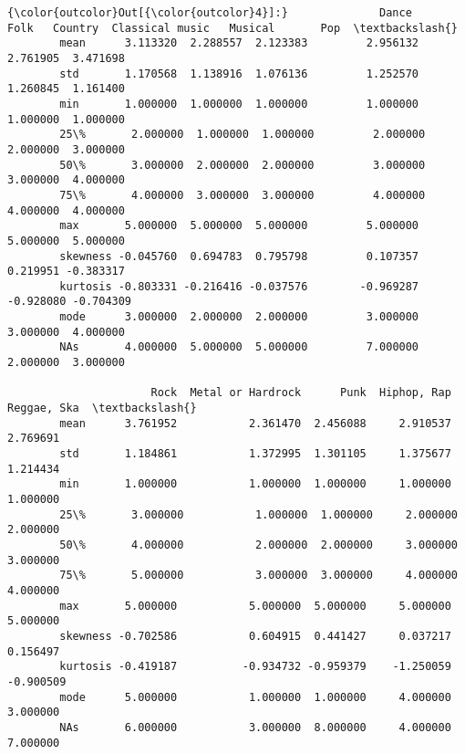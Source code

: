 \documentclass[11pt]{article}
\begin{document}
\begin{Verbatim}[commandchars=\\\{\}]
{\color{outcolor}Out[{\color{outcolor}4}]:}              Dance      Folk   Country  Classical music   Musical       Pop  \textbackslash{}
        mean      3.113320  2.288557  2.123383         2.956132  2.761905  3.471698   
        std       1.170568  1.138916  1.076136         1.252570  1.260845  1.161400   
        min       1.000000  1.000000  1.000000         1.000000  1.000000  1.000000   
        25\%       2.000000  1.000000  1.000000         2.000000  2.000000  3.000000   
        50\%       3.000000  2.000000  2.000000         3.000000  3.000000  4.000000   
        75\%       4.000000  3.000000  3.000000         4.000000  4.000000  4.000000   
        max       5.000000  5.000000  5.000000         5.000000  5.000000  5.000000   
        skewness -0.045760  0.694783  0.795798         0.107357  0.219951 -0.383317   
        kurtosis -0.803331 -0.216416 -0.037576        -0.969287 -0.928080 -0.704309   
        mode      3.000000  2.000000  2.000000         3.000000  3.000000  4.000000   
        NAs       4.000000  5.000000  5.000000         7.000000  2.000000  3.000000   
        
                      Rock  Metal or Hardrock      Punk  Hiphop, Rap  Reggae, Ska  \textbackslash{}
        mean      3.761952           2.361470  2.456088     2.910537     2.769691   
        std       1.184861           1.372995  1.301105     1.375677     1.214434   
        min       1.000000           1.000000  1.000000     1.000000     1.000000   
        25\%       3.000000           1.000000  1.000000     2.000000     2.000000   
        50\%       4.000000           2.000000  2.000000     3.000000     3.000000   
        75\%       5.000000           3.000000  3.000000     4.000000     4.000000   
        max       5.000000           5.000000  5.000000     5.000000     5.000000   
        skewness -0.702586           0.604915  0.441427     0.037217     0.156497   
        kurtosis -0.419187          -0.934732 -0.959379    -1.250059    -0.900509   
        mode      5.000000           1.000000  1.000000     4.000000     3.000000   
        NAs       6.000000           3.000000  8.000000     4.000000     7.000000   
        

\end{Verbatim}
\end{document}
